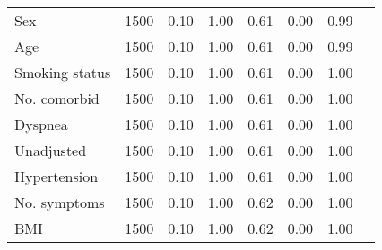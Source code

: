 \documentclass{article}
\begin{document}
{\begin{longtable}{lccccccc}
Sex & 1500 & 0.10 & 1.00 & 0.61 &  0.00 & 0.99 \\ 
Age & 1500 & 0.10 & 1.00 & 0.61 &  0.00 & 0.99 \\ 
Smoking status & 1500 & 0.10 & 1.00 & 0.61 &  0.00 & 1.00 \\ 
No. comorbid & 1500 & 0.10 & 1.00 & 0.61 &  0.00 & 1.00 \\ 
Dyspnea & 1500 & 0.10 & 1.00 & 0.61 &  0.00 & 1.00 \\ 
Unadjusted & 1500 & 0.10 & 1.00 & 0.61 &  0.00 & 1.00 \\ 
Hypertension & 1500 & 0.10 & 1.00 & 0.61 &  0.00 & 1.00 \\ 
No. symptoms & 1500 & 0.10 & 1.00 & 0.62 &  0.00 & 1.00 \\ 
BMI & 1500 & 0.10 & 1.00 & 0.62 &  0.00 & 1.00 \\
\bottomrule
\hline
\end{longtable}
}

\clearpage
\end{document}
